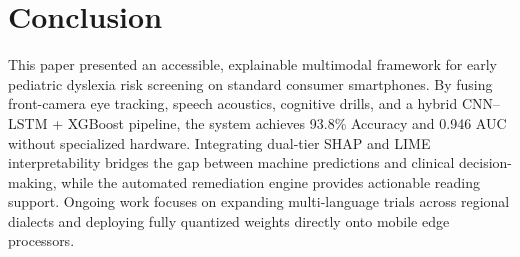 \documentclass[conference]{IEEEtran}
\begin{document}
\section{Conclusion}
This paper presented an accessible, explainable multimodal framework for early pediatric dyslexia risk screening on standard consumer smartphones. By fusing front-camera eye tracking, speech acoustics, cognitive drills, and a hybrid CNN--LSTM + XGBoost pipeline, the system achieves 93.8\% Accuracy and 0.946 AUC without specialized hardware. Integrating dual-tier SHAP and LIME interpretability bridges the gap between machine predictions and clinical decision-making, while the automated remediation engine provides actionable reading support. Ongoing work focuses on expanding multi-language trials across regional dialects and deploying fully quantized weights directly onto mobile edge processors.
\end{document}
